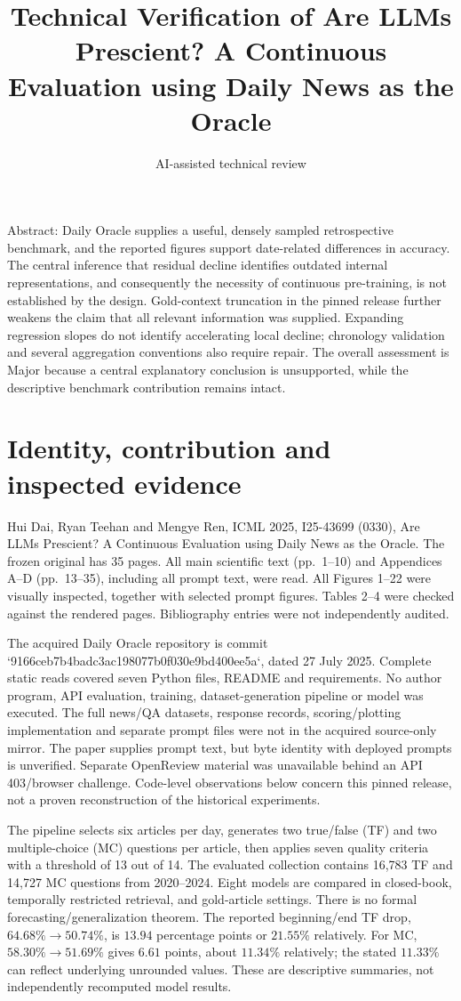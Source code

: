 \documentclass[10pt]{article}
\title{Technical Verification of Are LLMs Prescient? A Continuous Evaluation using Daily News as the Oracle}
\author{AI-assisted technical review}
\date{}
\begin{document}
\maketitle
Abstract: Daily Oracle supplies a useful, densely sampled retrospective benchmark, and the reported figures support date-related differences in accuracy. The central inference that residual decline identifies outdated internal representations, and consequently the necessity of continuous pre-training, is not established by the design. Gold-context truncation in the pinned release further weakens the claim that all relevant information was supplied. Expanding regression slopes do not identify accelerating local decline; chronology validation and several aggregation conventions also require repair. The overall assessment is Major because a central explanatory conclusion is unsupported, while the descriptive benchmark contribution remains intact.\par
\section*{Identity, contribution and inspected evidence}
Hui Dai, Ryan Teehan and Mengye Ren, ICML 2025, I25-43699 (0330), Are LLMs Prescient? A Continuous Evaluation using Daily News as the Oracle. The frozen original has 35 pages. All main scientific text (pp. 1–10) and Appendices A–D (pp. 13–35), including all prompt text, were read. All Figures 1–22 were visually inspected, together with selected prompt figures. Tables 2–4 were checked against the rendered pages. Bibliography entries were not independently audited.\par
The acquired Daily Oracle repository is commit `9166ceb7b4badc3ac198077b0f030e9bd400ee5a`, dated 27 July 2025. Complete static reads covered seven Python files, README and requirements. No author program, API evaluation, training, dataset-generation pipeline or model was executed. The full news/QA datasets, response records, scoring/plotting implementation and separate prompt files were not in the acquired source-only mirror. The paper supplies prompt text, but byte identity with deployed prompts is unverified. Separate OpenReview material was unavailable behind an API 403/browser challenge. Code-level observations below concern this pinned release, not a proven reconstruction of the historical experiments.\par
The pipeline selects six articles per day, generates two true/false (TF) and two multiple-choice (MC) questions per article, then applies seven quality criteria with a threshold of 13 out of 14. The evaluated collection contains 16,783 TF and 14,727 MC questions from 2020–2024. Eight models are compared in closed-book, temporally restricted retrieval, and gold-article settings. There is no formal forecasting/generalization theorem. The reported beginning/end TF drop, \(64.68\%\to50.74\%\), is \(13.94\) percentage points or \(21.55\%\) relatively. For MC, \(58.30\%\to51.69\%\) gives \(6.61\) points, about \(11.34\%\) relatively; the stated \(11.33\%\) can reflect underlying unrounded values. These are descriptive summaries, not independently recomputed model results.\par
\end{document}
